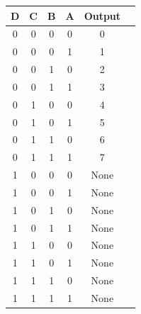 \documentclass[a4paper,12]{article}
\begin{document}
\begin{center}
    \begin{tabular}{|c|c|c|c|c|c|}
    \hline
    \textbf{D} & \textbf{C} & \textbf{B} & \textbf{A} & \textbf{Output} \\
    \hline
    0 & 0 & 0 & 0 & 0 \\
    0 & 0 & 0 & 1 & 1 \\
    0 & 0 & 1 & 0 & 2 \\
    0 & 0 & 1 & 1 & 3 \\
    0 & 1 & 0 & 0 & 4 \\
    0 & 1 & 0 & 1 & 5 \\
    0 & 1 & 1 & 0 & 6 \\
    0 & 1 & 1 & 1 & 7 \\
    1 & 0 & 0 & 0 & None \\
    1 & 0 & 0 & 1 & None \\
    1 & 0 & 1 & 0 & None \\
    1 & 0 & 1 & 1 & None \\
    1 & 1 & 0 & 0 & None \\
    1 & 1 & 0 & 1 & None \\
    1 & 1 & 1 & 0 & None \\
    1 & 1 & 1 & 1 & None \\
    \hline
    \end{tabular}
    \end{center}
\end{document}

